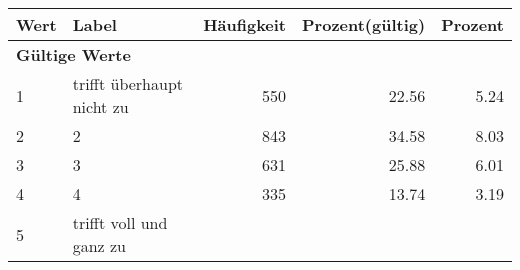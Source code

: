      \begin{longtable}{lXrrr}
     \toprule
     \textbf{Wert} & \textbf{Label} & \textbf{Häufigkeit} & \textbf{Prozent(gültig)} & \textbf{Prozent} \\
     \endhead
     \midrule
     \multicolumn{5}{l}{\textbf{Gültige Werte}}\\

     1 &
     \multicolumn{1}{X}{ trifft überhaupt nicht zu   } &


       \num{550} &
       \num[round-mode=places,round-precision=2]{22,56} &
         \num[round-mode=places,round-precision=2]{5,24} \\

     2 &
     \multicolumn{1}{X}{ 2   } &


       \num{843} &
       \num[round-mode=places,round-precision=2]{34,58} &
         \num[round-mode=places,round-precision=2]{8,03} \\

     3 &
     \multicolumn{1}{X}{ 3   } &


       \num{631} &
       \num[round-mode=places,round-precision=2]{25,88} &
         \num[round-mode=places,round-precision=2]{6,01} \\

     4 &
     \multicolumn{1}{X}{ 4   } &


       \num{335} &
       \num[round-mode=places,round-precision=2]{13,74} &
         \num[round-mode=places,round-precision=2]{3,19} \\

     5 &
     \multicolumn{1}{X}{ trifft voll und ganz zu   } &



\end{longtable}
